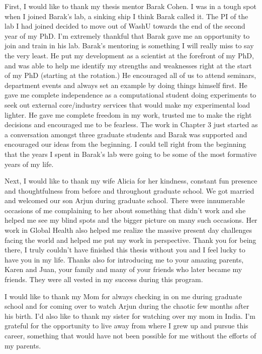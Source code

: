 \thesisacknowledgments

First, I would like to thank my thesis mentor Barak Cohen. I was in a tough spot when I joined Barak's lab, a sinking ship I think Barak called it. The PI of the lab I had joined decided to move out of WashU towards the end of the second year of my PhD. I'm extremely thankful that Barak gave me an opportunity to join and train in his lab. Barak's mentoring is something I will really miss to say the very least. He put my development as a scientist at the forefront of my PhD, and was able to help me identify my strengths and weaknesses right at the start of my PhD (starting at the rotation.) He encouraged all of us to attend seminars, department events and always set an example by doing things himself first. He gave me complete independence as a computational student doing experiments to seek out external core/industry services that would make my experimental load lighter. He gave me complete freedom in my work, trusted me to make the right decisions and encouraged me to be fearless. The work in Chapter 3 just started as a conversation amongst three graduate students and Barak was supported and encouraged our ideas from the beginning. I could tell right from the beginning that the years I spent in Barak's lab were going to be some of the most formative years of my life.

Next, I would like to thank my wife Alicia for her kindness, constant fun presence and thoughtfulness from before and throughout graduate school. We got married and welcomed our son Arjun during graduate school. There were innumerable occasions of me complaining to her about something that didn't work and she helped me see my blind spots and the bigger picture on many such occasions. Her work in Global Health also helped me realize the massive present day challenges facing the world and helped me put my work in perspective. Thank you for being there, I truly couldn't have finished this thesis without you and I feel lucky to have you in my life. Thanks also for introducing me to your amazing parents, Karen and Juan, your family and many of your friends who later became my friends. They were all vested in my success during this program.

I would like to thank my Mom for always checking in on me during graduate school and for coming over to watch Arjun during the chaotic few months after his birth. I'd also like to thank my sister for watching over my mom in India. I'm grateful for the opportunity to live away from where I grew up and pursue this career, something that would have not been possible for me without the efforts of my parents.

